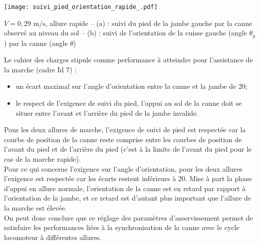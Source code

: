 \begin{marginfigure}%
\texttt{[image: suivi\_pied\_orientation\_rapide\_.pdf]}
   \caption{{ $V = 0,29$ m/s, allure rapide -- (a) : suivi du pied de la jambe gauche par la canne observé au niveau du sol -- (b) : suivi de l'orientation de la cuisse gauche (angle $\theta_g$) par la canne (angle $\theta$)}
\label{fig:suivi_pied_orientation_rapide}}
\end{marginfigure}


\fi


\ifprof
\begin{corrige}
Le cahier des charges stipule comme performance à atteindre pour l'assistance de la marche (cadre Id 7) :\\
\begin{itemize}
\item un écart maximal sur l'angle d'orientation entre la canne et la jambe de 20\degres;
\item le respect de l'exigence de suivi du pied, l'appui au sol de la canne doit se situer entre l'avant et l'arrière du pied de la jambe invalide.\\
\end{itemize}
Pour les deux allures de marche, l'exigence de suivi de pied est respectée car la courbe de position de la canne reste comprise entre les courbes de position de l'avant du pied et de l'arrière du pied (c'est à la limite de l'avant du pied pour le cas de la marche rapide).\\
Pour ce qui concerne l'exigence sur l'angle d'orientation, pour les deux allures l'exigence est respectée car les écarts restent inférieurs à 20\degre. Mise à part la phase d'appui en allure normale, l'orientation de la canne est en retard par rapport à l'orientation de la jambe, et ce retard est d'autant plus important que l'allure de la marche est élevée.\\
On peut donc conclure que ce réglage des paramètres d'asservissement permet de satisfaire les performances liées à la synchronisation de la canne avec le cycle locomoteur à différentes allures.
\end{corrige}
\fi




\ifprof
\else
